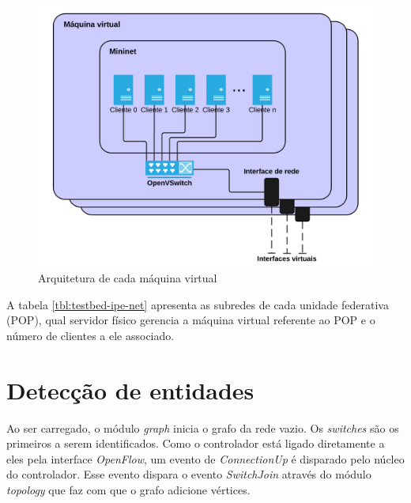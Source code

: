 \begin{figure}[h!]
    \centering
    \label{fig:mininet-vm-architecture}
    \includegraphics{img/mininet-vm-architecture}
    \caption{Arquitetura de cada máquina virtual}
\end{figure}


A tabela \ref{tbl:testbed-ipe-net} apresenta as subredes de cada unidade
federativa (POP), qual servidor físico gerencia a máquina virtual referente
ao POP e o número de clientes a ele associado.




\section{Detecção de entidades}

Ao ser carregado, o módulo \emph{graph} inicia o grafo da rede vazio.
Os \emph{switches} são os primeiros a serem identificados. 
Como o controlador está ligado diretamente a eles pela interface
\emph{OpenFlow}, um evento de \emph{ConnectionUp} é disparado 
pelo núcleo do controlador.
Esse evento dispara o evento \emph{SwitchJoin} através do módulo 
\emph{topology} que faz com que o grafo adicione vértices.

